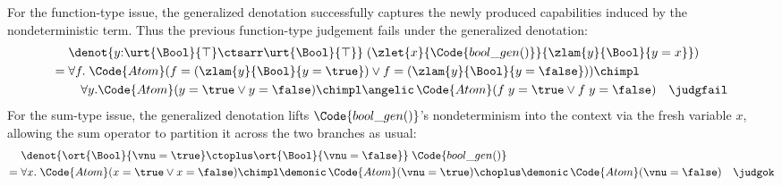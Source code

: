 For the function-type issue, the generalized denotation successfully captures the newly produced capabilities induced by the nondeterministic term. Thus the previous function-type judgement fails under the generalized denotation:
\begin{align*}
  &\denot{y{:}\urt{\Bool}{\top} \ctsarr \urt{\Bool}{\top}}\;
    (\zlet{x}{\Code{bool\_gen()}}{\zlam{y}{\Bool}{y = x}})
  \\=\;& \forall f.\; \Code{Atom}(f = (\zlam{y}{\Bool}{y = \true}) \lor
          f = (\zlam{y}{\Bool}{y = \false})) \chimpl
          \\& \quad \forall y. \Code{Atom}(y = \true \lor y = \false) \chimpl  \angelic\,\Code{Atom}(f\;y = \true \lor f\;y = \false)
  \quad\judgfail
\end{align*}
For the sum-type issue, the generalized denotation lifts
$\Code{bool\_gen()}$'s nondeterminism into the context via the fresh
variable $x$, allowing the sum operator to partition it across the
two branches as usual:
\begin{align*}
  &\denot{\ort{\Bool}{\vnu = \true} \ctoplus
          \ort{\Bool}{\vnu = \false}}\;\Code{bool\_gen()}
  \\=\;& \forall x.\; \Code{Atom}(x = \true \lor x = \false) \chimpl
          \demonic\,\Code{Atom}(\vnu = \true) \choplus
          \demonic\,\Code{Atom}(\vnu = \false)
  \quad\judgok
\end{align*}
